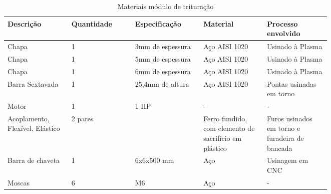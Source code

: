 \begin{table}[htp]
    \centering
    \caption{Materiais módulo de trituração}
    \label{my-label}
    \begin{tabular}{|p{0.15\linewidth}|p{0.15\linewidth}|p{0.15\linewidth}|p{0.15\linewidth}|p{0.15\linewidth}|}
    \hline
    \textbf{Descrição}              & \textbf{Quantidade} & \textbf{Especificação}                                            & \textbf{Material}                                     & \textbf{Processo envolvido}                    \\ \hline
    Chapa                           & 1                   & 3mm de espessura                                                  & Aço AISI 1020                                         & Usinado à Plasma                               \\ \hline
    Chapa                           & 1                   & 5mm de espessura                                                  & Aço AISI 1020                                         & Usinado à Plasma                               \\ \hline
    Chapa                           & 1                   & 6mm de espessura                                                  & Aço AISI 1020                                         & Usinado à Plasma                               \\ \hline
    Barra Sextavada                 & 1                   & 25,4mm de altura                                                  & Aço AISI 1020                                         & Pontas usinadas em torno                       \\ \hline
    Motor                           & 1                   & 1 HP                                                              & -                                                     & -                                              \\ \hline
    Acoplamento, Flexível, Elástico & 2 pares             &                                                                   & Ferro fundido, com elemento de sacrifício em plástico & Furos usinados em torno e furadeira de bancada \\ \hline
    Barra de chaveta                & 1                   & 6x6x500 mm                                                        & Aço                                                   & Usinagem em CNC                                \\ \hline
    Moscas                          & 6                   & M6                                                                & Aço                                                   & -                                              \\ \hline

\end{tabular}
\end{table}
